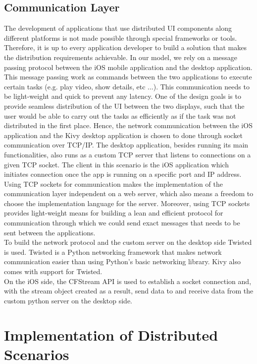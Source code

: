 \subsection{Communication Layer}
The development of applications that use distributed UI components along different platforms is not made possible through special frameworks or tools. Therefore, it is up to every application developer to build a solution that makes the distribution requirements achievable. In our model, we rely on a message passing protocol between the iOS mobile application and the desktop application. This message passing  work as commands between the two applications to execute certain tasks (e.g. play video, show details, etc ...). This communication needs to be light-weight and quick to prevent any latency. One of the design goals is to provide seamless distribution of the UI between the two displays, such that the user would be able to carry out the tasks as efficiently as if the task was not distributed in the first place. Hence, the network communication between the iOS application and the Kivy desktop application is chosen to done through socket communication over TCP/IP. The desktop application, besides running its main functionalities, also runs as a custom TCP server that listens to connections on a given TCP socket. The client in this scenario is the iOS application which initiates connection once the app is running on a specific port and IP address. Using TCP sockets for communication makes the implementation of the communication layer independent on a web server, which also means a freedom to choose the implementation language for the server. Moreover, using TCP sockets provides light-weight means for building a lean and efficient protocol for communication through which we could send exact messages that needs to be sent between the applications.\\
To build the network protocol and the custom server on the desktop side Twisted is used. Twisted is a Python networking framework that makes network communication easier than using Python's basic networking library. Kivy also comes with support for Twisted.\\
On the iOS side, the CFStream API is used to establish a socket connection and, with the stream object created as a result, send data to and receive data from the custom python server on the desktop side.

\section{Implementation of Distributed Scenarios}

